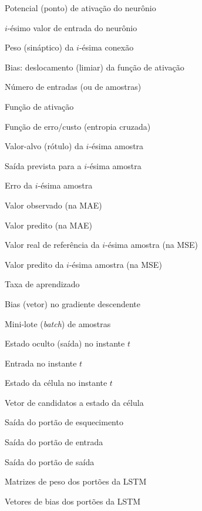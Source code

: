 
\begin{simbolos}
  \item[$ u $] Potencial (ponto) de ativação do neurônio
  \item[$ x_{i} $] $i$-ésimo valor de entrada do neurônio
  \item[$ w_{i} $] Peso (sináptico) da $i$-ésima conexão
  \item[$ \theta $] Bias: deslocamento (limiar) da função de ativação
  \item[$ n $] Número de entradas (ou de amostras)
  \item[$ f(x) $] Função de ativação

  \item[$ E(w) $] Função de erro/custo (entropia cruzada)
  \item[$ t_{i} $] Valor-alvo (rótulo) da $i$-ésima amostra
  \item[$ y_{i} $] Saída prevista para a $i$-ésima amostra
  \item[$ e_{i} $] Erro da $i$-ésima amostra
  \item[$ O_{i} $] Valor observado (na MAE)
  \item[$ P_{i} $] Valor predito (na MAE)
  \item[$ \theta_{i} $] Valor real de referência da $i$-ésima amostra (na MSE)
  \item[$ \theta_{ip} $] Valor predito da $i$-ésima amostra (na MSE)
  \item[$ \eta $] Taxa de aprendizado
  \item[$ b $] Bias (vetor) no gradiente descendente
  \item[$ \mathcal{B} $] Mini-lote (\textit{batch}) de amostras

  \item[$ h_{t} $] Estado oculto (saída) no instante $t$
  \item[$ x_{t} $] Entrada no instante $t$
  \item[$ C_{t} $] Estado da célula no instante $t$
  \item[$ \tilde{C}_{t} $] Vetor de candidatos a estado da célula
  \item[$ f_{t} $] Saída do portão de esquecimento
  \item[$ i_{t} $] Saída do portão de entrada
  \item[$ o_{t} $] Saída do portão de saída
  \item[$ W_{f}, W_{i}, W_{C}, W_{o} $] Matrizes de peso dos portões da LSTM
  \item[$ b_{f}, b_{i}, b_{C}, b_{o} $] Vetores de bias dos portões da LSTM


\end{simbolos}
